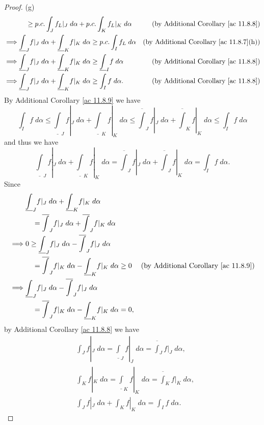 \begin{proof}{(g)}
\begin{align*}
                 & \quad \geq p.c. \int_J f_L|_J \; d \alpha + p.c. \int_K f_L|_K \; d \alpha                                      & \text{(by Additional Corollary \ref{ac 11.8.8})}    \\
        \implies & \underline{\int}_J f|_J \; d \alpha + \underline{\int}_K f|_K \; d \alpha \geq p.c. \int_I f_L \; d \alpha      & \text{(by Additional Corollary \ref{ac 11.8.7}(h))} \\
        \implies & \underline{\int}_J f|_J \; d \alpha + \underline{\int}_K f|_K \; d \alpha \geq \underline{\int}_I f \; d \alpha & \text{(by Additional Corollary \ref{ac 11.8.8})}    \\
        \implies & \underline{\int}_J f|_J \; d \alpha + \underline{\int}_K f|_K \; d \alpha \geq \int_I f \; d \alpha.            & \text{(by Additional Corollary \ref{ac 11.8.8})}
    \end{align*}
    By Additional Corollary \ref{ac 11.8.9} we have
    \[
        \int_I f \; d \alpha \leq \underline{\int}_J f|_J \; d \alpha + \underline{\int}_K f|_K \; d \alpha \leq \overline{\int}_J f|_J \; d \alpha + \overline{\int}_K f|_K \; d \alpha \leq \int_I f \; d \alpha
    \]
    and thus we have
    \[
        \underline{\int}_J f|_J \; d \alpha + \underline{\int}_K f|_K \; d \alpha = \overline{\int}_J f|_J \; d \alpha + \overline{\int}_J f|_K \; d \alpha = \int_I f \; d \alpha.
    \]
    Since
    \begin{align*}
                 & \underline{\int}_J f|_J \; d \alpha + \underline{\int}_K f|_K \; d \alpha                                                                  \\
                 & \quad = \overline{\int}_J f|_J \; d \alpha + \overline{\int}_J f|_K \; d \alpha                                                            \\
        \implies & 0 \geq \underline{\int}_J f|_J \; d \alpha - \overline{\int}_J f|_J \; d \alpha                                                            \\
                 & \quad = \overline{\int}_J f|_K \; d \alpha - \underline{\int}_K f|_K \; d \alpha \geq 0 & \text{(by Additional Corollary \ref{ac 11.8.9})} \\
        \implies & \underline{\int}_J f|_J \; d \alpha - \overline{\int}_J f|_J \; d \alpha                                                                   \\
                 & \quad = \overline{\int}_J f|_K \; d \alpha - \underline{\int}_K f|_K \; d \alpha = 0,
    \end{align*}
    by Additional Corollary \ref{ac 11.8.8} we have
    \begin{align*}
         & \int_J f|_J \; d \alpha = \underline{\int}_J f|_J \; d \alpha = \overline{\int}_J f|_J \; d \alpha, \\
         & \int_K f|_K \; d \alpha = \underline{\int}_K f|_K \; d \alpha = \overline{\int}_K f|_K \; d \alpha, \\
         & \int_J f|_J \; d \alpha + \int_K f|_K \; d \alpha = \int_I f \; d \alpha.
    \end{align*}
\end{proof}

